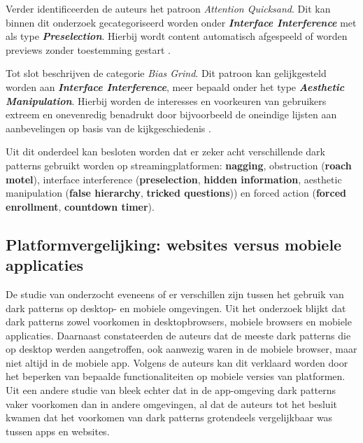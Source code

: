 \vspace{1em}

Verder identificeerden de auteurs het patroon \textit{Attention Quicksand}. Dit kan binnen dit onderzoek gecategoriseerd worden onder \textbf{\textit{Interface Interference}} met als type \textbf{\textcolor{ForestGreen}{\bol} \textit{Preselection}}. Hierbij wordt content automatisch afgespeeld of worden previews zonder toestemming gestart \autocite{Chaudhary2022}.

\vspace{1em}

Tot slot beschrijven \textcite{Chaudhary2022} de categorie \textit{Bias Grind}. Dit patroon kan gelijkgesteld worden aan \textbf{\textit{Interface Interference}}, meer bepaald onder het type \linebreak \textbf{\textcolor{ForestGreen}{\bol} \textit{Aesthetic Manipulation}}. Hierbij worden de interesses en voorkeuren van gebruikers extreem en onevenredig benadrukt door bijvoorbeeld de oneindige lijsten aan aanbevelingen op basis van de kijkgeschiedenis \autocite{Chaudhary2022}.

\vspace{1em}

Uit dit onderdeel kan besloten worden dat er zeker acht verschillende dark patterns gebruikt worden op streamingplatformen: \textbf{nagging}, obstruction (\textbf{roach motel}), interface interference (\textbf{preselection}, \textbf{hidden information}, aesthetic manipulation (\textbf{false hierarchy}, \textbf{tricked questions})) en forced action (\textbf{forced enrollment}, \textbf{countdown timer}).

\vspace{1em}

\subsection{Platformvergelijking: websites versus mobiele applicaties}
\label{subsec:platformvergelijking}

\vspace{1em}

De studie van \textcite{Nygren2024} onderzocht eveneens of er verschillen zijn tussen het gebruik van dark patterns op desktop- en mobiele omgevingen. Uit het onderzoek blijkt dat dark patterns zowel voorkomen in desktopbrowsers, mobiele browsers en mobiele applicaties. Daarnaast constateerden de auteurs dat de meeste dark patterns die op desktop werden aangetroffen, ook aanwezig waren in de mobiele browser, maar niet altijd in de mobiele app. Volgens de auteurs kan dit verklaard worden door het beperken van bepaalde functionaliteiten op mobiele versies van platformen. Uit een andere studie van \textcite{Commissie2022} bleek echter dat in de app-omgeving dark patterns vaker voorkomen dan in andere omgevingen, al dat de auteurs tot het besluit kwamen dat het voorkomen van dark patterns grotendeels vergelijkbaar was tussen apps en websites.

